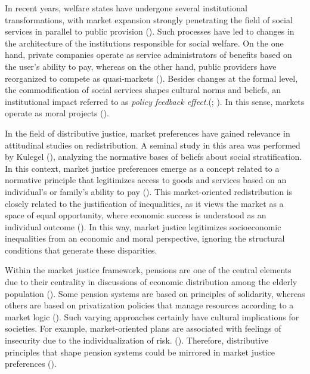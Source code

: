\documentclass[
  12pt,
]{article}
\begin{document}
In recent years, welfare states have undergone several institutional
transformations, with market expansion strongly penetrating the field of
social services in parallel to public provision
().
Such processes have led to changes in the architecture of the
institutions responsible for social welfare. On the one hand, private
companies operate as service administrators of benefits based on the
user's ability to pay, whereas on the other hand, public providers have
reorganized to compete as quasi-markets
(). Besides changes at the
formal level, the commodification of social services shapes cultural
norms and beliefs, an institutional impact referred to as \emph{policy
feedback effect}.(;
). In
this sense, markets operate as moral projects
().

In the field of distributive justice, market preferences have gained
relevance in attitudinal studies on redistribution. A seminal study in
this area was performed by Kulegel
(), analyzing the normative
bases of beliefs about social stratification. In this context, market
justice preferences emerge as a concept related to a normative principle
that legitimizes access to goods and services based on an individual's
or family's ability to pay (). This market-oriented redistribution is closely related to the
justification of inequalities, as it views the market as a space of
equal opportunity, where economic success is understood as an individual
outcome (). In this way, market justice legitimizes socioeconomic
inequalities from an economic and moral perspective, ignoring the
structural conditions that generate these disparities.

Within the market justice framework, pensions are one of the central
elements due to their centrality in discussions of economic distribution
among the elderly population
(). Some pension
systems are based on principles of solidarity, whereas others are based
on privatization policies that manage resources according to a market
logic (). Such varying approaches certainly have cultural
implications for societies. For example, market-oriented plans are
associated with feelings of insecurity due to the individualization of
risk. (). Therefore,
distributive principles that shape pension systems could be mirrored in
market justice preferences
().
\end{document}
